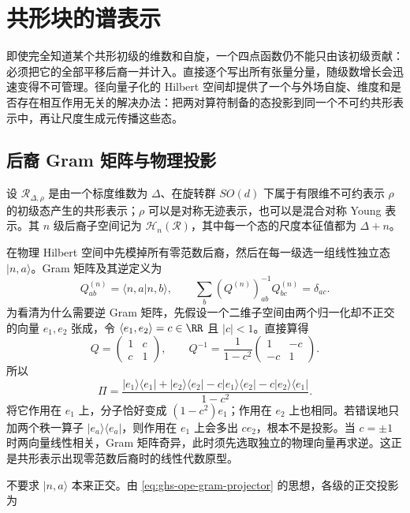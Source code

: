 \section{共形块的谱表示}
\label{sec:ghs-conformal-block-spectrum}


即使完全知道某个共形初级的维数和自旋，一个四点函数仍不能只由该初级贡献：必须把它的全部平移后裔一并计入。直接逐个写出所有张量分量，随级数增长会迅速变得不可管理。径向量子化的 Hilbert 空间却提供了一个与外场自旋、维度和是否存在相互作用无关的解决办法：把两对算符制备的态投影到同一个不可约共形表示中，再让尺度生成元传播这些态。


\subsection{后裔 Gram 矩阵与物理投影}

设 $\mathcal R_{\Delta,\rho}$ 是由一个标度维数为 $\Delta$、在旋转群 $SO(d)$ 下属于有限维不可约表示 $\rho$ 的初级态产生的共形表示；$\rho$ 可以是对称无迹表示，也可以是混合对称 Young 表示。其 $n$ 级后裔子空间记为 $\mathcal H_n(\mathcal R)$，其中每一个态的尺度本征值都为 $\Delta+n$。

在物理 Hilbert 空间中先模掉所有零范数后裔，然后在每一级选一组线性独立态 $|n,a\rangle$。Gram 矩阵及其逆定义为
\begin{equation}\label{eq:ghs-r4-general-level-gram}
 Q^{(n)}_{ab}=\langle n,a|n,b\rangle,\qquad
 \sum_b(Q^{(n)})^{-1}_{ab}Q^{(n)}_{bc}=\delta_{ac}.
\end{equation}
为看清为什么需要逆 Gram 矩阵，先假设一个二维子空间由两个归一化却不正交的向量 $e_1,e_2$ 张成，令 $\langle e_1,e_2\rangle=c\in\RR$ 且 $|c|<1$。直接算得
\[
 Q=\begin{pmatrix}1&c\\c&1\end{pmatrix},\qquad
 Q^{-1}=\frac1{1-c^2}\begin{pmatrix}1&-c\\-c&1\end{pmatrix}.
\]
所以
\[
 \Pi=\frac{|e_1\rangle\langle e_1|+|e_2\rangle\langle e_2|
 -c|e_1\rangle\langle e_2|-c|e_2\rangle\langle e_1|}{1-c^2}.
\]
将它作用在 $e_1$ 上，分子恰好变成 $(1-c^2)e_1$；作用在 $e_2$ 上也相同。若错误地只加两个秩一算子 $|e_a\rangle\langle e_a|$，则作用在 $e_1$ 上会多出 $c e_2$，根本不是投影。当 $c=\pm1$ 时两向量线性相关，Gram 矩阵奇异，此时须先选取独立的物理向量再求逆。这正是共形表示出现零范数后裔时的线性代数原型。

不要求 $|n,a\rangle$ 本来正交。由 \cref{eq:ghs-ope-gram-projector} 的思想，各级的正交投影为




